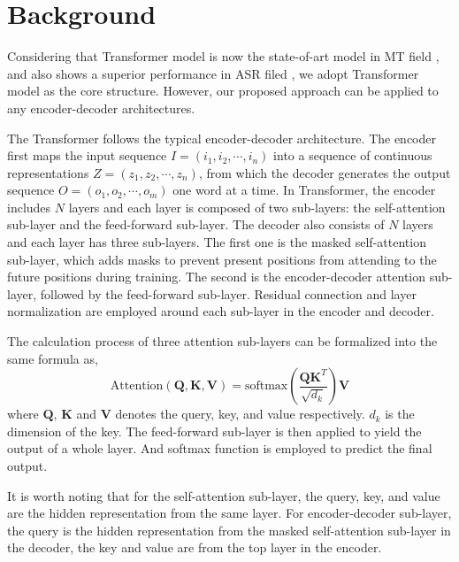 \documentclass[letterpaper]{article} %
\begin{document}
\section{Background}
\label{sec:transformer}
Considering that Transformer model is now the state-of-art model in MT field \cite{vaswani2017attention}, and also shows a superior performance in ASR filed  \cite{dong2018speech,zhou2018syllable}, we adopt Transformer model as the core structure.  However, our proposed approach can be applied to any encoder-decoder architectures. 

The Transformer follows the typical encoder-decoder architecture. The encoder first maps the input sequence $\mathbf{\mathit{I}}=(i_1,i_2,\cdots,i_n)$ into a sequence of continuous representations $\mathbf{\mathit{Z}}=(z_1,z_2,\cdots,z_n)$, from which  the decoder generates the output sequence $\mathbf{\mathit{O}}=(o_1,o_2,\cdots,o_m)$ one word at a time. In Transformer, the encoder includes $N$ layers and each layer is composed of two sub-layers: the self-attention sub-layer and the feed-forward sub-layer.
The decoder also consists of $N$ layers and each layer has three sub-layers. The first one is the masked self-attention sub-layer, which adds masks to prevent present positions from attending to the future positions during training. The second is the encoder-decoder attention sub-layer, followed by the feed-forward sub-layer. Residual connection and layer normalization are employed around each sub-layer in the encoder and decoder.

The calculation process of three attention sub-layers can be formalized into the same formula as, 
\begin{equation}
\mathrm{Attention(\mathbf{Q},\mathbf{K},\mathbf{V})}=\mathrm{softmax}(\frac{\mathbf{Q}\mathbf{K}^T}{\sqrt{d_k}})\mathbf{V} 
\label{equ:Attention}
\end{equation}
where $\mathbf{Q}$, $\mathbf{K}$ and $\mathbf{V}$ denotes the query, key, and value respectively. $d_k$ is the dimension of the key.
The feed-forward sub-layer is then applied to yield the output of a whole layer. And softmax function is employed to predict the final output.

It is worth noting that for the self-attention sub-layer, the query, key, and value are the hidden representation from the same layer. For encoder-decoder sub-layer, the query is the hidden representation from the masked self-attention sub-layer in the decoder, the key and value are from the top layer in the encoder. 
\end{document}
